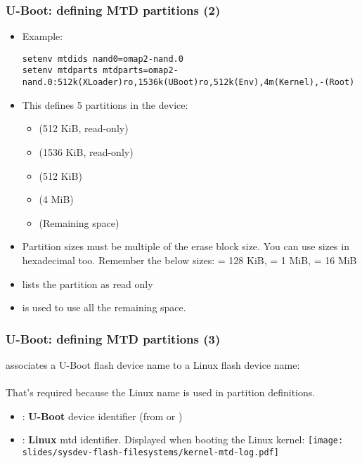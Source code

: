 \begin{frame}[fragile]
  \frametitle{U-Boot: defining MTD partitions (2)}
  \begin{itemize}
  \item Example:
  {\scriptsize
  \begin{verbatim}
setenv mtdids nand0=omap2-nand.0
setenv mtdparts mtdparts=omap2-nand.0:512k(XLoader)ro,1536k(UBoot)ro,512k(Env),4m(Kernel),-(Root)
  \end{verbatim}
  }
  \item This defines 5 partitions in the  device:
    \begin{itemize}
    \item {} (512 KiB, read-only)
    \item {} (1536 KiB, read-only)
    \item {} (512 KiB)
    \item {} (4 MiB)
    \item {} (Remaining space)
    \end{itemize}
  \item Partition sizes must be multiple of the erase block size.
    You can use sizes in hexadecimal too. Remember the below sizes:
     = 128 KiB,  = 1 MiB,  = 16 MiB
  \item {} lists the partition as read only
  \item \code{-} is used to use all the remaining space.
  \end{itemize}
\end{frame}


\begin{frame}[fragile]
  \frametitle{U-Boot: defining MTD partitions (3)}
   associates a U-Boot flash device name
  to a Linux flash device name:\\
  \\
  That's required because the Linux name is used in partition definitions.
  \begin{itemize}
  \item {}: {\bf U-Boot} device identifier (from
     or )
  \item {}: {\bf Linux} mtd identifier. Displayed
    when booting the Linux kernel:
    \texttt{[image: slides/sysdev-flash-filesystems/kernel-mtd-log.pdf]}\\
  \end{itemize}
\end{frame}

